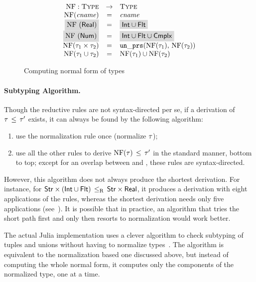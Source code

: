 \begin{figure}
  \[
	\begin{array}{rcl}
	\NF: \Type &\rightarrow& \Type \\
	\NF(\cname) &=& \cname \\
	\colorbox{light-gray}{\NF(\tyreal)} &=&
	\colorbox{light-gray}{\tyunion{\tyint}{\tyflt}} \\
	\colorbox{light-gray}{\NF(\tynum)} &=&
	\colorbox{light-gray}{\tyunion{\tyunion{\tyint}{\tyflt}}{\tycmplx}} \\
	\NF(\typair{\ty_1}{\ty_2}) &=& \unprs(\NF(\ty_1), \, \NF(\ty_2))	\\
	\NF(\tyunion{\ty_1}{\ty_2}) &=& \tyunion{\NF(\ty_1)}{\NF(\ty_2)} \\
	\end{array}
  \]
	\caption{Computing normal form of \BetaJulia types}
	\label{fig:bjsem-calc-nf}
\end{figure}

\paragraph{Subtyping Algorithm.}
Though the reductive rules are not syntax-directed per se,
if a derivation of $\tau \, \leq \, \tau'$ exists,
it can always be found by the following algorithm:
\begin{enumerate}
  \item use the normalization rule  once (normalize $\tau$);
  \item use all the other rules to derive 
    $\mathop{\mathrm{NF}}(\tau) \, \leq \, \tau'$ in the standard manner, bottom to top;
    except for an overlap between  and ,
    these rules are syntax-directed.
\end{enumerate}

However, this algorithm does not always produce the shortest derivation.
For instance, for
$\mathsf{Str} \times (\mathsf{Int} \cup \mathsf{Flt}) \, \leq_\mathrm{R} \, \mathsf{Str} \times \mathsf{Real}$,
it produces a derivation with eight applications of the rules, 
whereas the shortest derivation needs only five applications
(see~).
It is possible that in practice, an algorithm that tries the short path first 
and only then resorts to normalization would work better.

The actual Julia implementation uses a clever algorithm 
to check subtyping of tuples and unions 
without having to normalize types~\cite{bib:Chung19}.
The algorithm is equivalent to the normalization based one discussed above,
but instead of computing the whole normal form, 
it computes only the components of the normalized type, one at a time.

